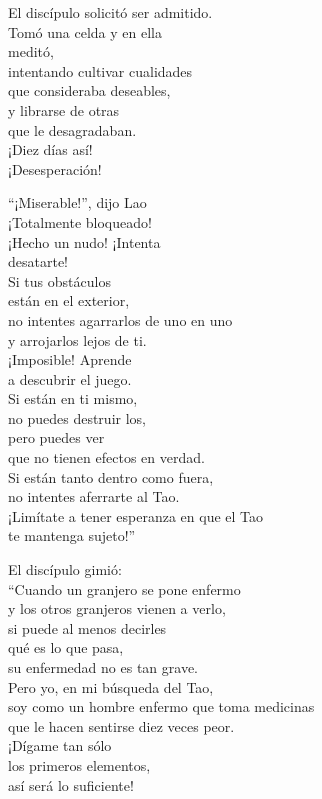 \documentclass[hidelinks]{memoir}
\begin{document}
	El discípulo solicitó ser admitido.\\
	Tomó una celda y en ella\\
	meditó,\\
	intentando cultivar cualidades\\
	que consideraba deseables,\\
	y librarse de otras\\
	que le desagradaban.\\
	¡Diez días así!\\
	¡Desesperación!
	
	``¡Miserable!'', dijo Lao\\
	¡Totalmente bloqueado!\\
	¡Hecho un nudo! ¡Intenta\\
	desatarte!\\
	Si tus obstáculos\\
	están en el exterior,\\
	no intentes agarrarlos de uno en uno\\
	y arrojarlos lejos de ti.\\
	¡Imposible! Aprende\\
	a descubrir el juego.\\
	Si están en ti mismo,\\
	no puedes destruir los,\\
	pero puedes ver\\
	que no tienen efectos en verdad.\\
	Si están tanto dentro como fuera,\\
	no intentes aferrarte al Tao.\\
	¡Limítate a tener esperanza en que el Tao\\
	te mantenga sujeto!''
	
	El discípulo gimió:\\
	``Cuando un granjero se pone enfermo\\
	y los otros granjeros vienen a verlo,\\
	si puede al menos decirles\\
	qué es lo que pasa,\\
	su enfermedad no es tan grave.\\
	Pero yo, en mi búsqueda del Tao,\\
	soy como un hombre enfermo que toma medicinas\\
	que le hacen sentirse diez veces peor.\\
	¡Dígame tan sólo\\
	los primeros elementos,\\
	así será lo suficiente!
	
\end{document}
